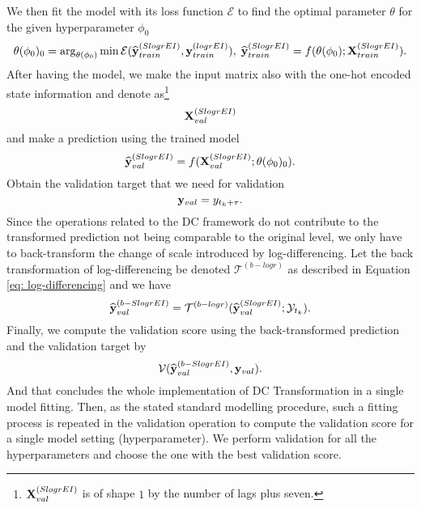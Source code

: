 We then fit the model with its loss function $\mathcal{E}$ to find the optimal parameter $\theta$ for the given hyperparameter $\phi_0$
\begin{equation*}
    \theta(\phi_0)_0 = \arg_{\theta(\phi_0)} \min \mathcal{E}(\widehat{\mathbf{y}}^{(SlogrEI)}_{train}, \mathbf{y}^{(logrEI)}_{train}), \; \widehat{\mathbf{y}}^{(SlogrEI)}_{train} = f(\theta(\phi_0); \mathbf{X}^{(SlogrEI)}_{train}).
\end{equation*}
After having the model, we make the input matrix also with the one-hot encoded state information and denote as\footnote{$\mathbf{X}^{(SlogrEI)}_{val}$ is of shape $1$ by the number of lags plus seven.}
\begin{equation*}
    \mathbf{X}^{(SlogrEI)}_{val}
\end{equation*}
and make a prediction using the trained model
\begin{equation*}
    \widehat{\mathbf{y}}^{(SlogrEI)}_{val} = f(\mathbf{X}^{(SlogrEI)}_{val} ; \theta(\phi_0)_0).
\end{equation*}
Obtain the validation target that we need for validation
\begin{equation*}
    \mathbf{y}_{val} = y_{t_k + \tau}.
\end{equation*}
Since the operations related to the DC framework do not contribute to the transformed prediction not being comparable to the original level, we only have to back-transform the change of scale introduced by log-differencing. Let the back transformation of log-differencing be denoted $\mathcal{T}^{(b-logr)}$ as described in Equation \ref{eq: log-differencing} and we have
\begin{equation*}
    \widehat{\mathbf{y}}^{(b-SlogrEI)}_{val} = \mathcal{T}^{(b-logr)} (\widehat{\mathbf{y}}^{(SlogrEI)}_{val} ; \mathcal{Y}_{t_k}).
\end{equation*}
Finally, we compute the validation score using the back-transformed prediction and the validation target by
\begin{equation*}
    \mathcal{V} (\widehat{\mathbf{y}}^{(b-SlogrEI)}_{val}, \mathbf{y}_{val}).
\end{equation*}
And that concludes the whole implementation of DC Transformation in a single model fitting. Then, as the stated standard modelling procedure, such a fitting process is repeated in the validation operation to compute the validation score for a single model setting (hyperparameter). We perform validation for all the hyperparameters and choose the one with the best validation score.

